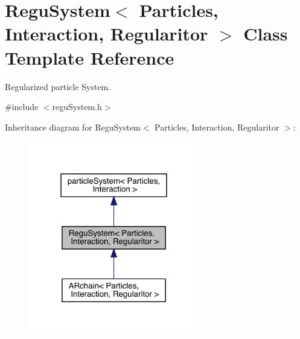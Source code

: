 \hypertarget{class_regu_system}{}\section{Regu\+System$<$ Particles, Interaction, Regularitor $>$ Class Template Reference}
\label{class_regu_system}


Regularized particle System.  




{\ttfamily \#include $<$regu\+System.\+h$>$}



Inheritance diagram for Regu\+System$<$ Particles, Interaction, Regularitor $>$\+:\nopagebreak
\begin{figure}[H]
\begin{center}
\leavevmode
\includegraphics[width=211pt]{class_regu_system__inherit__graph}
\end{center}
\end{figure}


